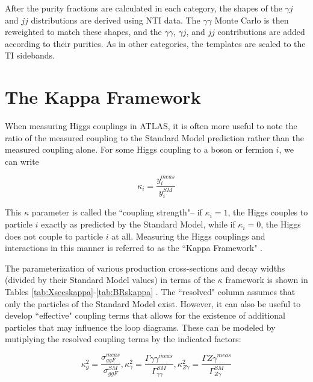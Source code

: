 After the purity fractions are calculated in each category, the shapes of the $\gamma j$ and $jj$ distributions are derived using NTI data. The $\gamma \gamma$ Monte Carlo is then reweighted to match these shapes, and the $\gamma \gamma$, $\gamma j$, and $jj$ contributions are added according to their purities. As in other categories, the templates are scaled to the TI sidebands. 

\section{The Kappa Framework} \label{sec:kappaFW}

When measuring Higgs couplings in ATLAS, it is often more useful to note the ratio of the measured coupling to the Standard Model prediction rather than the measured coupling alone. For some Higgs coupling to a boson or fermion $i$, we can write

\begin{equation}
\kappa_{i} = \frac{y_{i}^{meas}}{y_{i}^{SM}}
\end{equation}

This $\kappa$ parameter is called the ``coupling strength"-- if $\kappa_{i} = 1$, the Higgs couples to particle $i$ exactly as predicted by the Standard Model, while if $\kappa_{i} = 0$, the Higgs does not couple to particle $i$ at all. Measuring the Higgs couplings and interactions in this manner is referred to as the ``Kappa Framework" \cite{kappaFW}.

The parameterization of various production cross-sections and decay widths (divided by their Standard Model values) in terms of the $\kappa$ framework is shown in Tables \ref{tab:Xsecskappa}-\ref{tab:BRskappa} \cite{PhysRevD.101.012002}. The ``resolved" column assumes that only the particles of the Standard Model exist. However, it can also be useful to develop ``effective" coupling terms that allows for the existence of additional particles that may influence the loop diagrams. These can be modeled by mutiplying the resolved coupling terms by the indicated factors:

\begin{equation}
\kappa_{g}^{2} = \frac{\sigma_{ggF}^{meas}}{\sigma_{ggF}^{SM}}, \kappa_{\gamma}^{2} = \frac{\Gamma{\gamma \gamma}^{meas}}{\Gamma_{\gamma \gamma}^{SM}}, \kappa_{Z \gamma}^{2} = \frac{\Gamma{Z \gamma}^{meas}}{\Gamma_{Z \gamma}^{SM}}
\end{equation}

